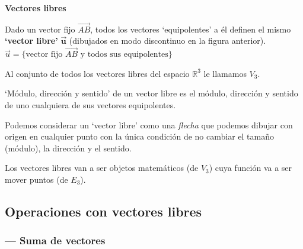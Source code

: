 \begin{defi}{\textbf{Vectores libres}}

Dado un vector fijo $\overrightarrow {AB}$, todos los vectores `equipolentes' a él definen el mismo \textbf{`vector libre'} $\boldsymbol{ \vec u }$ (dibujados en modo discontinuo en la figura anterior). $\vec u=\{\text{vector fijo } \overrightarrow {AB} \text{ y todos sus equipolentes} \}$

Al conjunto de todos los vectores libres del espacio $\mathbb R^3$ le llamamos $V_3$. 

`Módulo, dirección y sentido' de un vector libre es el módulo, dirección y sentido de uno cualquiera de sus vectores equipolentes.	
\end{defi}

Podemos considerar un `vector libre' como una \textit{flecha} que podemos dibujar con origen en cualquier punto con la única condición de no cambiar el tamaño (módulo), la dirección y el sentido.

Los vectores libres van a ser objetos matemáticos (de $V_3$) cuya función va a ser mover puntos (de $E_3$).

\subsection{Operaciones con vectores libres}

\subsubsection{--- Suma de vectores}

